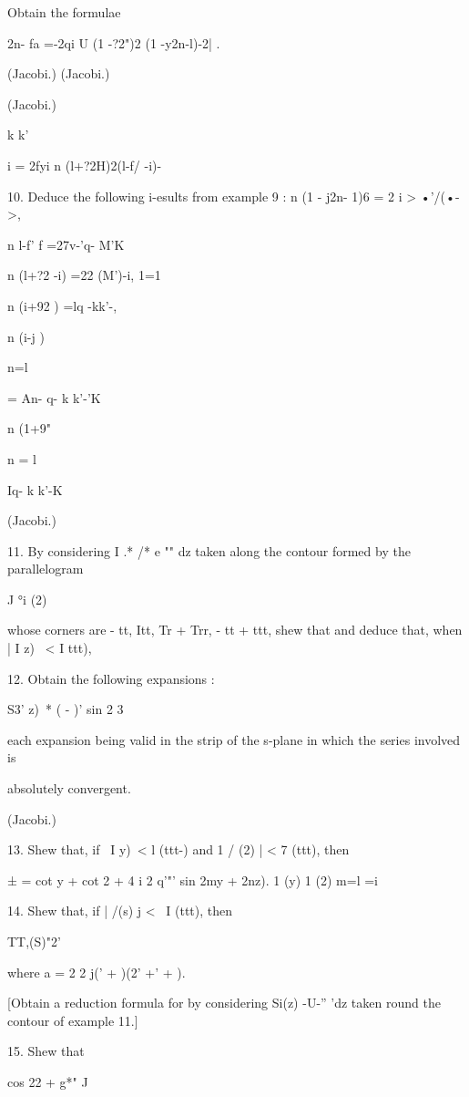 Obtain the formulae

2n- fa =-2qi U (1 -?2")2 (1 -y2n-l)-2| .

(Jacobi.) (Jacobi.)

(Jacobi.)

k k'

i = 2fyi n (l+?2H)2(l-f/ -i)-

10. Deduce the following i-esults from example 9 : n (1 - j2n- 1)6 = 2
i > •'/(•->,

n l-f' f =27v-'q- M'K\

n (l+?2 -i) =22 (M')-i, 1=1

n (i+92 ) =lq -kk'-,

n (i-j )

n=l

= An- q- k k'-'K\

n (1+9"

n = l

Iq- k k'-K

(Jacobi.)

%
%

11. By considering I .* /* e "" dz taken along the contour formed by
the parallelogram

J °i (2)

whose corners are - tt, Itt, Tr + Trr, - tt + ttt, shew that and
deduce that, when | I z) \ < I ttt),

12. Obtain the following expansions :

S3' z)\ * ( - )' sin 2 3

each expansion being valid in the strip of the s-plane in which the
series involved is

absolutely convergent.

(Jacobi.)

13. Shew that, if \ I y)\ < l (ttt-) and 1 / (2) | < 7 (ttt), then

  ± = cot y + cot 2 + 4 i 2 q'"' sin 2my + 2nz). 1 (y) 1 (2) m=l =i


14. Shew that, if | /(s) j < \ I (ttt), then

TT,(S)"2'

where a = 2 2 j(' + )(2' +' + ).


[Obtain a reduction formula for by considering Si(z) -U-'' 'dz taken
round the contour of example 11.]

15. Shew that

cos 22 + g*" J

